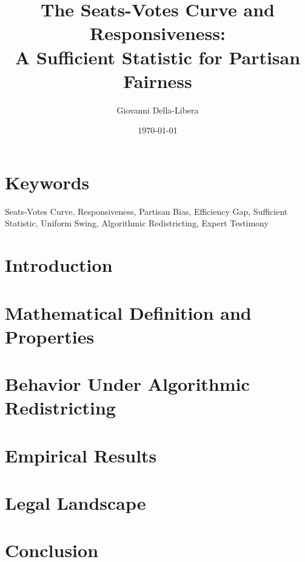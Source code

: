 \documentclass[12pt]{article}
\title{\textbf{The Seats-Votes Curve and Responsiveness:\\
A Sufficient Statistic for Partisan Fairness}}
\author{Giovanni Della-Libera}
\date{\today}
\begin{document}
\maketitle

\begin{abstract}

\end{abstract}

\section*{Keywords}
Seats-Votes Curve, Responsiveness, Partisan Bias, Efficiency Gap, Sufficient Statistic,
Uniform Swing, Algorithmic Redistricting, Expert Testimony

\section{Introduction}


\section{Mathematical Definition and Properties}


\section{Behavior Under Algorithmic Redistricting}


\section{Empirical Results}


\section{Legal Landscape}


\section{Conclusion}




\end{document}
